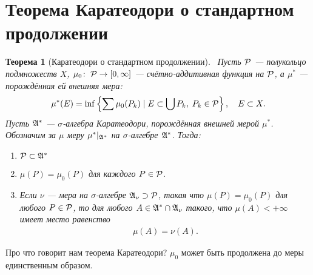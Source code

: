 \documentclass[a4paper,14pt]{extarticle}
\newcounter{theoremCnt}
\theoremstyle{definition}
\theoremstyle{plain}
\newtheorem{thm}[theoremCnt]{Теорема}
\theoremstyle{plain}
\theoremstyle{plain}
\theoremstyle{plain}
\theoremstyle{definition}
\theoremstyle{definition}
\theoremstyle{definition}
\theoremstyle{definition}
\theoremstyle{definition}
\theoremstyle{definition}
\theoremstyle{plain}
\theoremstyle{plain}
\theoremstyle{plain}
\theoremstyle{plain}
\theoremstyle{definition}
\theoremstyle{definition}
\theoremstyle{definition}
\theoremstyle{definition}
\theoremstyle{definition}
\newcommand{\A}{\ensuremath \mathfrak{A}}
\newcommand{\p}{\ensuremath \mathcal{P}}
\begin{document}
\section{Теорема Каратеодори о стандартном продолжении}
\begin{thm}[Каратеодори о стандартном продолжении]\
 Пусть $ \p $ --- полукольцо подмножеств $ X $, $ \mu_0 \colon\; \p \to [0, \infty] $ --- счётно-аддитивная функция на $ \p $, а $ \mu^\ast $ --- порождённая ей внешняя мера:
 \begin{align*}
  \mu^\ast(E) = \inf \left\{ \sum \mu_0(P_k) \mid E \subset \bigcup P_k,\; P_k \in \p \right\}, \quad E \subset X
  .\end{align*} Пусть $ \A^\ast $ --- $ \sigma $-алгебра Каратеодори, порождённая внешней мерой $ \mu^\ast $. Обозначим за $ \mu $ меру $ \mu^\ast \rvert_{\A^\ast} $ на $ \sigma $-алгебре $ \A^\ast $. Тогда:
 \begin{enumerate}
  \item $ \p \subset \A^\ast $
  \item $ \mu(P) = \mu_0(P) $ для каждого $ P \in \p $.
  \item Если $ \nu $ --- мера на $ \sigma $-алгебре $ \A_\nu \supset \p $, такая что $ \mu(P) = \mu_0(P) $ для любого $ P \in \p $, то для любого $ A \in \A^\ast \cap \A_\nu $ такого, что $ \mu(A) < +\infty $ имеет место равенство
  \begin{align*}
   \mu(A) = \nu(A)
   .\end{align*}
 \end{enumerate}
\end{thm}
Про что говорит нам теорема Каратеодори? $ \mu_0 $ может быть продолжена до меры единственным образом.
\end{document}
